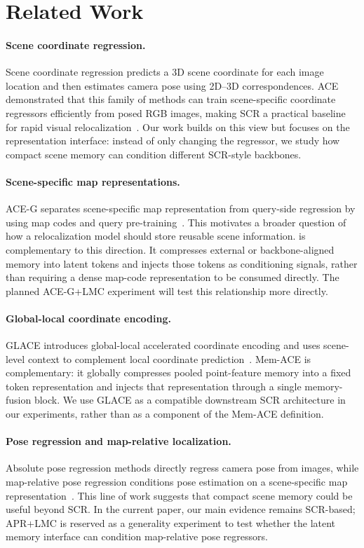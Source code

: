 \section{Related Work}

\paragraph{Scene coordinate regression.}
Scene coordinate regression predicts a 3D scene coordinate for each image location and then estimates camera pose using 2D--3D correspondences. ACE demonstrated that this family of methods can train scene-specific coordinate regressors efficiently from posed RGB images, making SCR a practical baseline for rapid visual relocalization~\cite{brachmann2023ace}. Our work builds on this view but focuses on the representation interface: instead of only changing the regressor, we study how compact scene memory can condition different SCR-style backbones.

\paragraph{Scene-specific map representations.}
ACE-G separates scene-specific map representation from query-side regression by using map codes and query pre-training~\cite{bruns2025aceg}. This motivates a broader question of how a relocalization model should store reusable scene information. \shortmethod{} is complementary to this direction. It compresses external or backbone-aligned memory into latent tokens and injects those tokens as conditioning signals, rather than requiring a dense map-code representation to be consumed directly. The planned ACE-G+LMC experiment will test this relationship more directly.

\paragraph{Global-local coordinate encoding.}
GLACE introduces global-local accelerated coordinate encoding and uses scene-level context to complement local coordinate prediction~\cite{wang2024glace}. Mem-ACE is complementary: it globally compresses pooled point-feature memory into a fixed token representation and injects that representation through a single memory-fusion block. We use GLACE as a compatible downstream SCR architecture in our experiments, rather than as a component of the Mem-ACE definition.

\paragraph{Pose regression and map-relative localization.}
Absolute pose regression methods directly regress camera pose from images, while map-relative pose regression conditions pose estimation on a scene-specific map representation~\cite{chen2024marepo}. This line of work suggests that compact scene memory could be useful beyond SCR. In the current paper, our main evidence remains SCR-based; APR+LMC is reserved as a generality experiment to test whether the latent memory interface can condition map-relative pose regressors.

